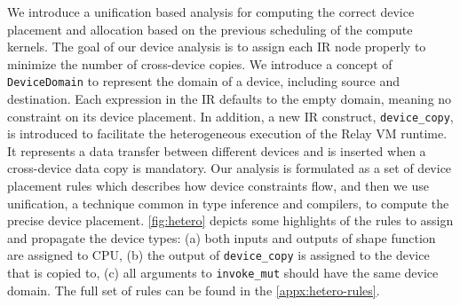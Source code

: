 We introduce a unification based analysis for computing the correct device placement
  and allocation based on the previous scheduling of the compute kernels.
The goal of our device analysis is to assign each IR node properly to minimize
  the number of cross-device copies.
We introduce a concept of \texttt{DeviceDomain} to represent the domain of a device,
  including source and destination.
Each expression in the IR defaults to the empty domain, meaning no constraint on its device placement.
In addition, a new IR construct, \verb|device_copy|, is introduced to facilitate the heterogeneous execution
  of the Relay VM runtime.
It represents a data transfer between different devices and is inserted when a cross-device data copy is mandatory.
Our analysis is formulated as a set of device placement rules which describes how device constraints flow, and then we use unification, a technique common in type inference and compilers, to compute the precise device placement.
\autoref{fig:hetero} depicts some highlights of the rules to assign and propagate the device types: (a) both inputs and outputs of shape function are assigned to CPU, (b) the output of \verb|device_copy| is assigned to the device that is copied to, (c) all arguments to \verb|invoke_mut| should have the same device domain. The full set of rules can be found in the \autoref{appx:hetero-rules}.

